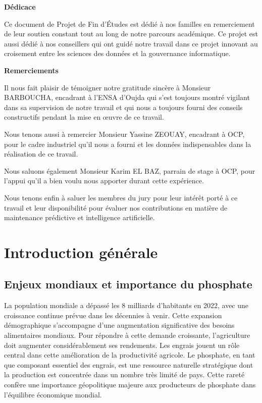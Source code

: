 \documentclass[a4paper,12pt,twoside]{report}
\begin{document}
\newpage
\thispagestyle{empty}
\begin{center}
\Large\textbf{Dédicace}
\end{center}

\vspace{2cm}

Ce document de Projet de Fin d’Études est dédié à nos familles en remerciement
de leur soutien constant tout au long de notre parcours académique. Ce projet est aussi dédié à nos conseillers qui ont guidé notre travail dans ce projet innovant au croisement entre les sciences des données et la gouvernance informatique.

\newpage
\thispagestyle{empty}
\begin{center}
\Large\textbf{Remerciements}
\end{center}

\vspace{2cm}

Il nous fait plaisir de témoigner notre gratitude sincère à Monsieur BARBOUCHA, encadrant à l’ENSA d’Oujda qui s’est toujours montré vigilant dans sa supervision de notre travail et qui nous a toujours fourni des conseils constructifs pendant la mise en œuvre de ce travail.

Nous tenons aussi à remercier Monsieur Yassine ZEOUAY, encadrant à OCP, pour le cadre industriel qu’il nous a fourni et les données indispensables dans la réalisation de ce travail.

Nous saluons également Monsieur Karim EL BAZ, parrain de stage à OCP, pour l’appui qu’il a bien voulu nous apporter durant cette expérience.

Nous tenons enfin à saluer les membres du jury pour leur intérêt porté à ce travail et leur disponibilité pour évaluer nos contributions en matière de maintenance prédictive et intelligence artificielle.

\newpage
\tableofcontents

\newpage
\chapter*{Introduction générale}
\thispagestyle{plain}

\section*{Enjeux mondiaux et importance du phosphate}

La population mondiale a dépassé les 8 milliards d'habitants en 2022, avec une croissance continue prévue dans les décennies à venir. Cette expansion démographique s'accompagne d'une augmentation significative des besoins alimentaires mondiaux. Pour répondre à cette demande croissante, l'agriculture doit augmenter considérablement ses rendements. Les engrais jouent un rôle central dans cette amélioration de la productivité agricole. Le phosphate, en tant que composant essentiel des engrais, est une ressource naturelle stratégique dont la production est concentrée dans un nombre très limité de pays. Cette rareté confère une importance géopolitique majeure aux producteurs de phosphate dans l'équilibre économique mondial.
\end{document}
